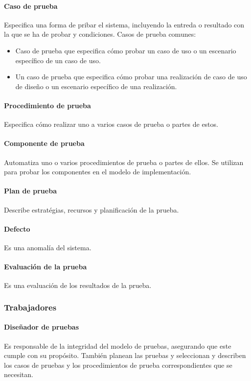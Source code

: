 \paragraph{Caso de prueba}
Especifica una forma de pribar el sistema, incluyendo la entreda o resultado con la que se ha de probar y condiciones. Casos de prueba comunes:
\begin{itemize}
	\item Caso de prueba que especifica cómo probar un caso de uso o un escenario específico de un caso de uso.
	\item Un caso de prueba que especifica cómo probar una realización de caso de uso de diseño o un escenario específico de una realización.
\end{itemize}
\paragraph{Procedimiento de prueba}
Especifica cómo realizar uno a varios casos de prueba o partes de estos.
\paragraph{Componente de prueba}
Automatiza uno o varios procedimientos de prueba o partes de ellos. Se utilizan para probar los componentes en el modelo de implementación.
\paragraph{Plan de prueba}
Describe estratégias, recursos y planificación de la prueba.
\paragraph{Defecto}
Es una anomalía del sistema.
\paragraph{Evaluación de la prueba}
Es una evaluación de los resultados de la prueba.
\subsubsection{Trabajadores}
\paragraph{Diseñador de pruebas}
Es responsable de la integridad del modelo de pruebas, asegurando que este cumple con su propósito. También planean las pruebas y seleccionan y describen los casos de pruebas y los procedimientos de prueba correspondientes que se necesitan.
